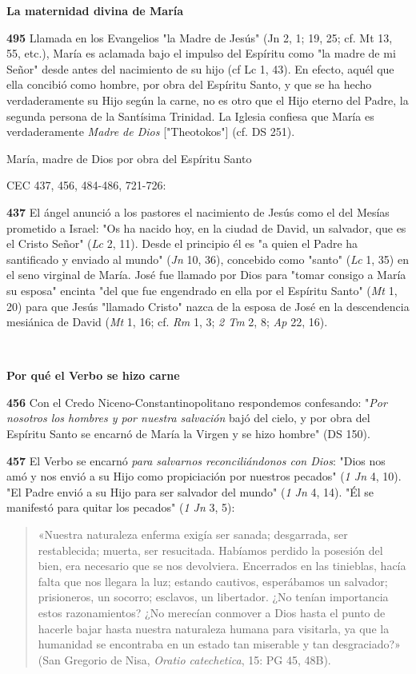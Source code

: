 \documentclass[]{article}
\begin{document}
\textbf{La maternidad divina de María}

\textbf{495} Llamada en los Evangelios "la Madre de Jesús" (Jn 2, 1; 19,
25; cf. Mt 13, 55, etc.), María es aclamada bajo el impulso del Espíritu
como "la madre de mi Señor" desde antes del nacimiento de su hijo (cf Lc
1, 43). En efecto, aquél que ella concibió como hombre, por obra del
Espíritu Santo, y que se ha hecho verdaderamente su Hijo según la carne,
no es otro que el Hijo eterno del Padre, la segunda persona de la
Santísima Trinidad. La Iglesia confiesa que María es verdaderamente
\emph{Madre de Dios} {[}"Theotokos"{]} (cf. DS 251).

María, madre de Dios  por obra del Espíritu Santo

CEC 437, 456, 484-486, 721-726:

\textbf{437} El ángel anunció a los pastores el nacimiento de Jesús como
el del Mesías prometido a Israel: "Os ha nacido hoy, en la ciudad de
David, un salvador, que es el Cristo Señor" (\emph{Lc} 2, 11). Desde el
principio él es "a quien el Padre ha santificado y enviado al mundo"
(\emph{Jn} 10, 36), concebido como "santo" (\emph{Lc} 1, 35) en el seno
virginal de María. José fue llamado por Dios para "tomar consigo a María
su esposa" encinta "del que fue engendrado en ella por el Espíritu
Santo" (\emph{Mt} 1, 20) para que Jesús "llamado Cristo" nazca de la
esposa de José en la descendencia mesiánica de David (\emph{Mt} 1, 16;
cf. \emph{Rm} 1, 3; \emph{2 Tm} 2, 8; \emph{Ap} 22, 16).

\textbf{\\
}

\textbf{Por qué el Verbo se hizo carne}

\textbf{456} Con el Credo Niceno-Constantinopolitano respondemos
confesando: "\emph{Por nosotros los hombres y por nuestra salvación}
bajó del cielo, y por obra del Espíritu Santo se encarnó de María la
Virgen y se hizo hombre" (DS 150).

\textbf{457} El Verbo se encarnó \emph{para salvarnos reconciliándonos
con Dios}: "Dios nos amó y nos envió a su Hijo como propiciación por
nuestros pecados" (\emph{1 Jn} 4, 10). "El Padre envió a su Hijo para
ser salvador del mundo" (\emph{1 Jn} 4, 14). "Él se manifestó para
quitar los pecados" (\emph{1 Jn} 3, 5):

\begin{quote}
«Nuestra naturaleza enferma exigía ser sanada; desgarrada, ser
restablecida; muerta, ser resucitada. Habíamos perdido la posesión del
bien, era necesario que se nos devolviera. Encerrados en las tinieblas,
hacía falta que nos llegara la luz; estando cautivos, esperábamos un
salvador; prisioneros, un socorro; esclavos, un libertador. ¿No tenían
importancia estos razonamientos? ¿No merecían conmover a Dios hasta el
punto de hacerle bajar hasta nuestra naturaleza humana para visitarla,
ya que la humanidad se encontraba en un estado tan miserable y tan
desgraciado?» (San Gregorio de Nisa, \emph{Oratio catechetica}, 15: PG
45, 48B).
\end{quote}
\end{document}

